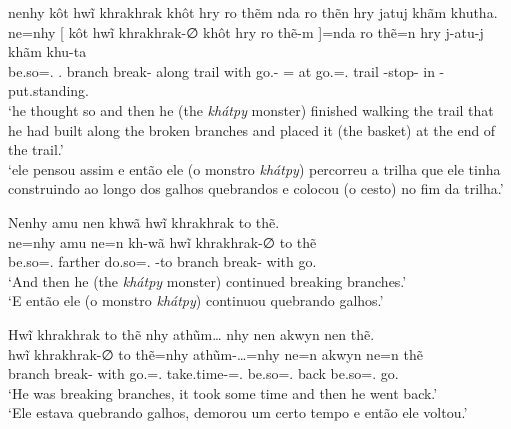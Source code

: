 \documentclass[output=paper,
modfonts,nonflat
]{langsci/langscibook}
\begin{document}
\ea  nenhy kôt hwĩ khrakhrak khôt hry ro thẽm nda ro thẽn hry jatuj khãm khutha. \\[.3em]
\gll ne=nhy           [  kôt           hwĩ    khrakhrak-∅   khôt  hry   ro   thẽ-m          ]=nda                  ro thẽ=n             hry   j-atu-j         khãm khu-ta                    \\
     be.so=\AAnd.\Ds{} {} \Third.\Erg{} branch break-\Nmlz{} along trail with go.\Sg-\Nmlz{} {}=\Def\footnotemark{} at go.\Sg=\AAnd.\Ss{} trail \E-stop-\Nmlz{} in   \Third-put.standing.\Sg{} \\
\glt `he thought so and then he (the \textit{khátpy} monster) finished walking the trail that he had built along the broken branches and placed it (the basket) at the end of the trail.' \\
     `ele pensou assim e então ele (o monstro \textit{khátpy}) percorreu a trilha que ele tinha construindo ao longo dos galhos quebrandos e colocou (o cesto) no fim da trilha.' \\
\label{exe:relcla1}
\z

\ea  Nenhy amu nen khwã hwĩ khrakhrak to thẽ. \\[.3em]
\gll ne=nhy           amu     ne=n             kh-wã     hwĩ    khrakhrak-∅   to   thẽ      \\
     be.so=\AAnd.\Ds{} farther do.so=\AAnd.\Ss{} \Third-to branch break-\Nmlz{} with go.\Sg{} \\
\glt `And then he (the \textit{khátpy} monster) continued breaking branches.' \\
     `E então ele (o monstro \textit{khátpy}) continuou quebrando galhos.' \\
\z

\ea  Hwĩ khrakhrak to thẽ nhy athũm\ldots{} nhy nen akwyn nen thẽ. \\[.3em]
\gll hwĩ    khrakhrak-∅   to   thẽ=nhy             athũm-\ldots{}=nhy            ne=n             akwyn ne=n             thẽ      \\
     branch break-\Nmlz{} with go.\Sg{}=\AAnd.\Ds{} take.time-\Ints{}=\AAnd.\Ds{} be.so=\AAnd.\Ss{} back  be.so=\AAnd.\Ss{} go.\Sg{} \\
\glt `He was breaking branches, it took some time and then he went back.' \\
     `Ele estava quebrando galhos, demorou um certo tempo e então ele voltou.' \\
\z
\end{document}
